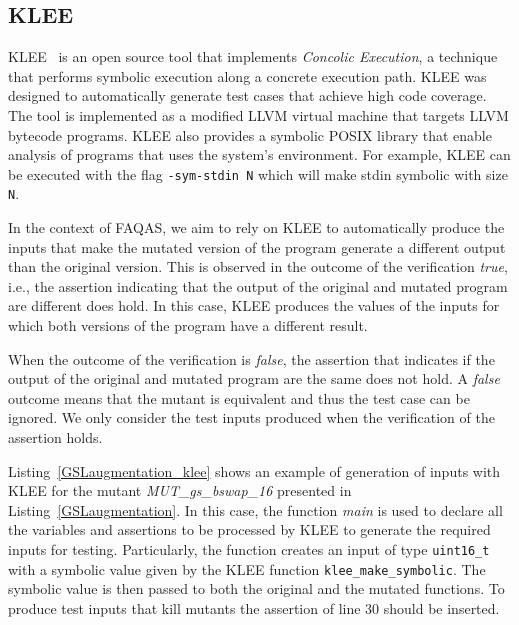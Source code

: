 
\subsection{KLEE}

KLEE~\cite{cadar2008klee} is an open source tool that implements {\em Concolic Execution}, a technique that performs symbolic execution along a concrete execution path. KLEE was designed to automatically generate test cases that achieve high code coverage. The tool is implemented as a modified LLVM virtual machine that targets LLVM bytecode programs.
KLEE also provides a symbolic POSIX library that enable analysis of programs that uses the system's environment. For example, KLEE can be executed with the flag \texttt{-sym-stdin N} which will make stdin symbolic with size \texttt{N}.  

In the context of FAQAS, we aim to rely on KLEE to automatically produce the inputs that make the mutated version of the program generate a different output than the original version.
This is observed in the outcome of the verification \emph{true}, i.e., the assertion indicating that the output of the original and mutated program are different does hold. In this case, KLEE produces the values of the inputs for which both versions of the program have a different result.

When the outcome of the verification is \emph{false}, the assertion that indicates if the output of the original and mutated program are the same does not hold. A \emph{false} outcome means that the mutant is equivalent and thus the test case can be ignored. 
We only consider the test inputs produced when the verification of the assertion holds.



Listing~\ref{GSLaugmentation_klee} shows an example of generation of inputs with KLEE for the mutant \linebreak\emph{MUT\_gs\_bswap\_16} presented in Listing~\ref{GSLaugmentation}. In this case, the function \emph{main} is used to declare all the variables and assertions to be processed by KLEE to generate the required inputs for testing. Particularly, the function creates an input of type \texttt{uint16\_t} with a symbolic value given by the KLEE function \texttt{klee\_make\_symbolic}. The symbolic value is then passed to both the original and the mutated functions. To produce test inputs that kill mutants the assertion of line 30 should be inserted.


